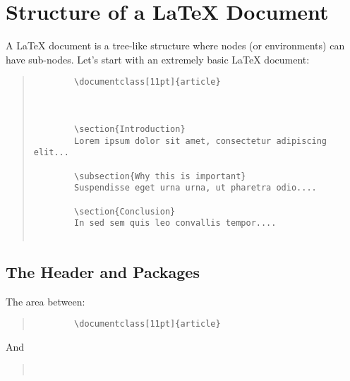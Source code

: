 \section{Structure of a LaTeX Document}

A LaTeX document is a tree-like structure where nodes (or environments) can have sub-nodes.  Let's start with an extremely basic LaTeX document:

\begin{quote}
	\begin{verbatim}
		\documentclass[11pt]{article}
		
		 
		
		\section{Introduction}
		Lorem ipsum dolor sit amet, consectetur adipiscing elit...
		
		\subsection{Why this is important}
		Suspendisse eget urna urna, ut pharetra odio....
		
		\section{Conclusion}
		In sed sem quis leo convallis tempor....		
		
	\end{verbatim}
\end{quote}

\subsection{The Header and Packages}

The area between:

\begin{quote}
	\begin{verbatim}
		\documentclass[11pt]{article}
	\end{verbatim}
\end{quote}

And 

\begin{quote}
	\begin{verbatim}
		 
	\end{verbatim}
\end{quote}

